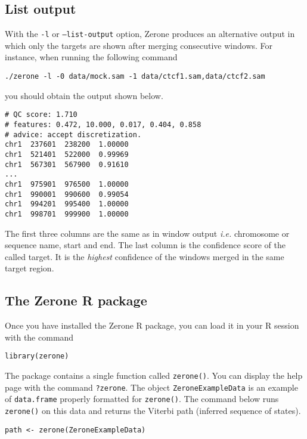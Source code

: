 \documentclass[12pt]{article}
\begin{document}
\subsection{List output}

With the \texttt{-l} or \texttt{--list-output} option, Zerone produces
an alternative output in which only the targets are shown after
merging consecutive windows. For instance, when running the following
command

\begin{verbatim}
./zerone -l -0 data/mock.sam -1 data/ctcf1.sam,data/ctcf2.sam
\end{verbatim}

\noindent
you should obtain the output shown below.

\begin{verbatim}
# QC score: 1.710
# features: 0.472, 10.000, 0.017, 0.404, 0.858
# advice: accept discretization.
chr1  237601  238200  1.00000
chr1  521401  522000  0.99969
chr1  567301  567900  0.91610
...
chr1  975901  976500  1.00000
chr1  990001  990600  0.99054
chr1  994201  995400  1.00000
chr1  998701  999900  1.00000
\end{verbatim}

The first three columns are the same as in window output \textit{i.e.}
chromosome or sequence name, start and end. The last column is the
confidence score of the called target. It is the \textit{highest}
confidence of the windows merged in the same target region.

\subsection*{The Zerone R package}

Once you have installed the Zerone R package, you can load it in
your R session with the command

\begin{verbatim}
library(zerone)
\end{verbatim}

The package contains a single function called \texttt{zerone()}.
You can display the help page with the command \texttt{?zerone}.
The object \texttt{ZeroneExampleData} is an example of
\texttt{data.frame} properly formatted for \texttt{zerone()}.
The command below runs \texttt{zerone()} on this data and
returns the Viterbi path (inferred sequence of states).

\begin{verbatim}
path <- zerone(ZeroneExampleData)
\end{verbatim}
\end{document}
